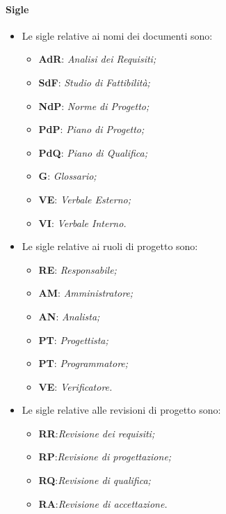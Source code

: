 \paragraph{Sigle}
\begin{itemize}
	\item Le sigle relative ai nomi dei documenti sono:
	\begin{itemize}
		\item \textbf{AdR}: \textit{Analisi dei Requisiti;}	
		\item \textbf{SdF}: \textit{Studio di Fattibilità;}	
		\item \textbf{NdP}: \textit{Norme di Progetto;}	
		\item \textbf{PdP}: \textit{Piano di Progetto;}	
		\item \textbf{PdQ}: \textit{Piano di Qualifica;}
		\item \textbf{G}: \textit{Glossario;}
		\item \textbf{VE}: \textit{Verbale Esterno;}	
		\item \textbf{VI}: \textit{Verbale Interno.}
	\end{itemize}	
	\item Le sigle relative ai ruoli di progetto sono:	
	\begin{itemize}		
		\item \textbf{RE}: \textit{Responsabile;}		
		\item \textbf{AM}: \textit{Amministratore;}		
		\item \textbf{AN}: \textit{Analista;}		
		\item \textbf{PT}: \textit{Progettista;}		
		\item \textbf{PT}: \textit{Programmatore;}	
		\item \textbf{VE}: \textit{Verificatore.}	
	\end{itemize}	
	\item Le sigle relative alle revisioni di progetto sono:	
	\begin{itemize}	
		\item \textbf{RR}:\textit{Revisione dei requisiti;} 			
		\item \textbf{RP}:\textit{Revisione di progettazione;} 		
		\item \textbf{RQ}:\textit{Revisione di qualifica;} 		
		\item \textbf{RA}:\textit{Revisione di accettazione.} 	
	\end{itemize}	
\end{itemize}
